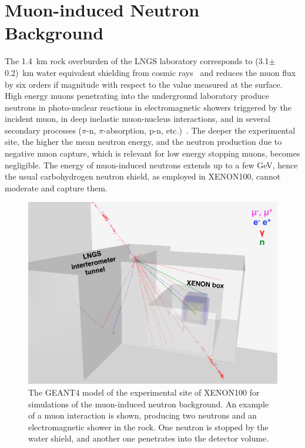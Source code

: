\section{Muon-induced Neutron Background}
\label{secNRmuons}

The 1.4~km rock overburden of the LNGS laboratory corresponds to (3.1$\pm$0.2)~km water equivalent shielding from cosmic rays~\cite{MeiHime} and reduces the muon flux by six orders if magnitude with respect to the value measured at the surface. 
High energy muons penetrating into the underground laboratory produce neutrons in photo-nuclear reactions in electromagnetic showers triggered by the incident muon, in deep inelastic muon-nucleus interactions, and in several secondary processes ($\pi$-n, $\pi$-absorption, p-n, etc.)~\cite{MuonInducedNeutronProduction_1, MuonInducedNeutronProduction_2}. The deeper the experimental site, the higher the mean neutron energy, and the neutron production due to negative muon capture, which is relevant for low energy stopping muons, becomes negligible. The energy of muon-induced neutrons extends up to a few GeV, hence the usual carbohydrogen neutron shield, as employed in XENON100, cannot moderate and capture them.

\begin{figure}[!t]
\centering
\includegraphics[width=1.0\linewidth]{plots/NRmuons/MuonSimulation_withNeutrons.png}
\caption[An example of a muon interaction in the GEANT4 simulation]{The GEANT4 model of the experimental site of XENON100 for simulations of the muon-induced neutron background. An example of a muon interaction is shown, producing two neutrons and an electromagnetic shower in the rock. One neutron is stopped by the water shield, and another one penetrates into the detector volume.}
\label{figMuonSimulation}
\end{figure}


